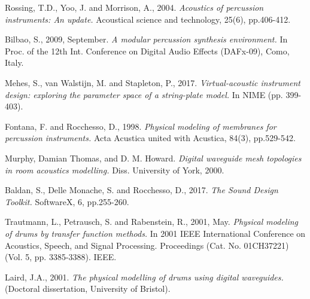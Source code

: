 \documentclass{article}
\begin{document}
\begin{thebibliography}{9}

Rossing, T.D., Yoo, J. and Morrison, A., 2004.
\textit{Acoustics of percussion instruments: An update.}
Acoustical science and technology, 25(6), pp.406-412.

Bilbao, S., 2009, September.
\textit{A modular percussion synthesis environment.}
In Proc. of the 12th Int.
Conference on Digital Audio Effects (DAFx-09), Como, Italy.

Mehes, S., van Walstijn, M. and Stapleton, P., 2017.
\textit{Virtual-acoustic instrument design:
exploring the parameter space of a string-plate model.}
In NIME (pp. 399-403).

Fontana, F. and Rocchesso, D., 1998.
\textit{Physical modeling of membranes for percussion instruments.}
Acta Acustica united with Acustica, 84(3), pp.529-542.

Murphy, Damian Thomas, and D. M. Howard.
\textit{Digital waveguide mesh topologies in room acoustics modelling.}
Diss. University of York, 2000.

Baldan, S., Delle Monache, S. and Rocchesso, D., 2017.
\textit{The Sound Design Toolkit.} SoftwareX, 6, pp.255-260.

Trautmann, L., Petrausch, S. and Rabenstein, R., 2001, May.
\textit{Physical modeling of drums by transfer function methods.}
In 2001 IEEE International Conference on Acoustics,
Speech, and Signal Processing. Proceedings
(Cat. No. 01CH37221) (Vol. 5, pp. 3385-3388). IEEE.

Laird, J.A., 2001.
\textit{The physical modelling of drums using digital waveguides.}
(Doctoral dissertation, University of Bristol).

\end{thebibliography}
\end{document}
